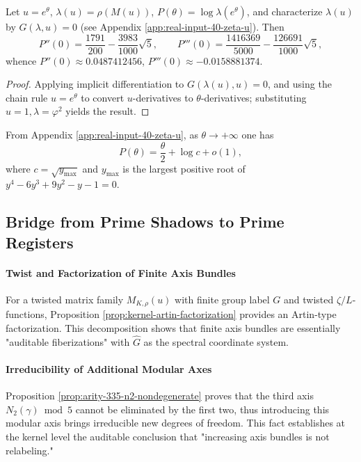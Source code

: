 \begin{proposition}\label{prop:pom-pressure-cumulants}
Let $u=e^{\theta}$, $\lambda(u)=\rho(M(u))$, $P(\theta)=\log\lambda(e^\theta)$, and characterize $\lambda(u)$ by
\(
G(\lambda,u)=0
\)
(see Appendix \ref{app:real-input-40-zeta-u}). Then
\[
P''(0)=\frac{1791}{200}-\frac{3983}{1000}\sqrt5,
\qquad
P'''(0)=\frac{1416369}{5000}-\frac{126691}{1000}\sqrt5,
\]
whence $P''(0)\approx 0.0487412456$, $P'''(0)\approx -0.0158881374$.
\end{proposition}
\begin{proof}
Applying implicit differentiation to $G(\lambda(u),u)=0$, and using the chain rule $u=e^\theta$ to convert $u$-derivatives to $\theta$-derivatives; substituting $u=1,\lambda=\varphi^2$ yields the result.
\end{proof}

\begin{corollary}\label{cor:pom-pressure-zero-temp}
From Appendix \ref{app:real-input-40-zeta-u}, as $\theta\to+\infty$ one has
\[
P(\theta)=\frac{\theta}{2}+\log c+o(1),
\]
where $c=\sqrt{y_{\max}}$ and $y_{\max}$ is the largest positive root of $y^4-6y^3+9y^2-y-1=0$.
\end{corollary}



\subsection{Bridge from Prime Shadows to Prime Registers}\label{subsec:pom-prime-bridge}
\paragraph{Twist and Factorization of Finite Axis Bundles}
For a twisted matrix family $M_{K,\rho}(u)$ with finite group label $G$ and twisted $\zeta/L$-functions, Proposition \ref{prop:kernel-artin-factorization} provides an Artin-type factorization. This decomposition shows that finite axis bundles are essentially "auditable fiberizations" with $\widehat G$ as the spectral coordinate system.

\paragraph{Irreducibility of Additional Modular Axes}
Proposition \ref{prop:arity-335-n2-nondegenerate} proves that the third axis $N_2(\gamma)\bmod 5$ cannot be eliminated by the first two, thus introducing this modular axis brings irreducible new degrees of freedom. This fact establishes at the kernel level the auditable conclusion that "increasing axis bundles is not relabeling."

